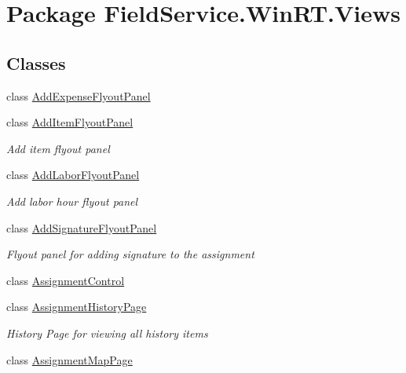 \hypertarget{namespace_field_service_1_1_win_r_t_1_1_views}{\section{Package Field\+Service.\+Win\+R\+T.\+Views}
\label{namespace_field_service_1_1_win_r_t_1_1_views}
}
\subsection*{Classes}
\begin{DoxyCompactItemize}
\item 
class \hyperlink{class_field_service_1_1_win_r_t_1_1_views_1_1_add_expense_flyout_panel}{Add\+Expense\+Flyout\+Panel}
\item 
class \hyperlink{class_field_service_1_1_win_r_t_1_1_views_1_1_add_item_flyout_panel}{Add\+Item\+Flyout\+Panel}
\begin{DoxyCompactList}\small\item\em Add item flyout panel \end{DoxyCompactList}\item 
class \hyperlink{class_field_service_1_1_win_r_t_1_1_views_1_1_add_labor_flyout_panel}{Add\+Labor\+Flyout\+Panel}
\begin{DoxyCompactList}\small\item\em Add labor hour flyout panel \end{DoxyCompactList}\item 
class \hyperlink{class_field_service_1_1_win_r_t_1_1_views_1_1_add_signature_flyout_panel}{Add\+Signature\+Flyout\+Panel}
\begin{DoxyCompactList}\small\item\em Flyout panel for adding signature to the assignment \end{DoxyCompactList}\item 
class \hyperlink{class_field_service_1_1_win_r_t_1_1_views_1_1_assignment_control}{Assignment\+Control}
\item 
class \hyperlink{class_field_service_1_1_win_r_t_1_1_views_1_1_assignment_history_page}{Assignment\+History\+Page}
\begin{DoxyCompactList}\small\item\em History Page for viewing all history items \end{DoxyCompactList}\item 
class \hyperlink{class_field_service_1_1_win_r_t_1_1_views_1_1_assignment_map_page}{Assignment\+Map\+Page}

\end{DoxyCompactItemize}
